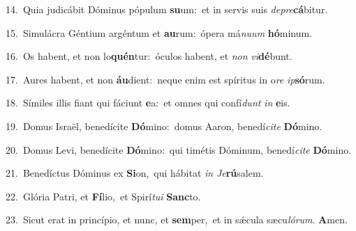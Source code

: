 {\numbfont\textcolor{\numbcolor}{14.}}~Quia judicábit Dóminus pópulum \textbf{su}\-um:~\star et in servis suis \textit{de}\-\textit{pre}\textbf{cá}bitur.\par
{\numbfont\textcolor{\numbcolor}{15.}}~Simulácra Géntium argéntum et \textbf{au}\-rum:~\star ópera má\-\textit{nu}\-\textit{um} \textbf{hó}\-minum.\par
{\numbfont\textcolor{\numbcolor}{16.}}~Os habent, et non lo\-\textbf{quén}\-tur:~\star óculos habent, et \textit{non} \textit{vi}\-\textbf{dé}bunt.\par
{\numbfont\textcolor{\numbcolor}{17.}}~Aures habent, et non \textbf{áu}\-dient:~\star neque enim est spíritus in o\textit{re} \textit{ip}\-\textbf{só}rum.\par
{\numbfont\textcolor{\numbcolor}{18.}}~Símiles illis fiant qui fáciunt \textbf{e}\-a:~\star et omnes qui confí\textit{dunt} \textit{in} \textbf{e}\-is.\par
{\numbfont\textcolor{\numbcolor}{19.}}~Domus Israël, benedícite \textbf{Dó}\-mino:~\star domus Aaron, benedí\-\textit{ci}\-\textit{te} \textbf{Dó}\-mino.\par
{\numbfont\textcolor{\numbcolor}{20.}}~Domus Levi, benedícite \textbf{Dó}\-mino:~\star qui timétis Dóminum, benedí\-\textit{ci}\-\textit{te} \textbf{Dó}\-mino.\par
{\numbfont\textcolor{\numbcolor}{21.}}~Benedíctus Dóminus ex \textbf{Si}\-on,~\star qui hábitat \textit{in} \textit{Je}\-\textbf{rú}salem.\par
{\numbfont\textcolor{\numbcolor}{22.}}~Glória Patri, et \textbf{Fí}\-lio,~\star et Spirí\-\textit{tu}\-\textit{i} \textbf{Sanc}\-to.\par
{\numbfont\textcolor{\numbcolor}{23.}}~Sicut erat in princípio, et nunc, et \textbf{sem}\-per,~\star et in sǽcula sæcu\-\textit{ló}\-\textit{rum}. \textbf{A}\-men.\par
